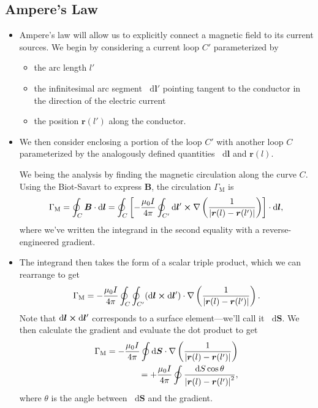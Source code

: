 \documentclass[11pt, a4paper]{article}
\newcommand{\diff}{\mathop{}\!\mathrm{d}} %
\renewcommand{\vec}[1]{\bm{#1}} %
\renewcommand{\r}{\vec{r}}
\newcommand{\B}{\vec{B}} %
\newcommand{\mm}{\mu_{0}}  %
\renewcommand{\j}{\vec{j}}  %
\renewcommand{\curl}{\nabla \cross}
\renewcommand{\grad}{\nabla}
\begin{document}
\subsection{Ampere's Law}
\begin{itemize}
	\item Ampere's law will allow us to explicitly connect a magnetic field to its current sources. We begin by considering a current loop $ C' $ parameterized by
    \begin{itemize}
        \item the arc length $ l' $

        \item the infinitesimal arc segment $ \diff \vec{l}' $ pointing tangent to the conductor in the direction of the electric current

        \item the position $ \r(l')  $ along the conductor.
    \end{itemize}

	\item We then consider enclosing a portion of the loop $ C' $ with another  loop $ C $ parameterized by the analogously defined quantities $ \diff \vec{l} $ and $ \r(l) $.
	
	
	We being the analysis by finding the magnetic circulation along the curve $ C $. Using the Biot-Savart to express $ \B $, the circulation $ \Gamma_{\text{M}} $ is
	\begin{equation*}
		\Gamma_{\text{M}} = \oint_{C} \B \cdot \diff \vec{l} = \oint_{C}\left[ - \frac{\mm I}{4 \pi} \oint_{C'}\diff \vec{l}' \cross \grad \left(\frac{1}{\abs{\r(l) - \r(l')}}\right) \right] \cdot \diff \vec{l},
	\end{equation*}
	where we've written the integrand in the second equality with a reverse-engineered gradient. 

    \item The integrand then takes the form of a scalar triple product, which we can rearrange to get
	\begin{equation*}
		\Gamma_{\text{M}} =  - \frac{\mm I}{4\pi} \oint_{C} \oint_{C'} (\diff \vec{l} \cross \diff \vec{l}') \cdot \grad \left(\frac{1}{\abs{\r(l) - \r(l')}}\right).
	\end{equation*}
	Note that $ \diff \vec{l} \cross \diff \vec{l}' $ corresponds to a surface element---we'll call it $ \diff \vec{S} $. We then calculate the gradient and evaluate the dot product to get
	\begin{align*}
		\Gamma_{\text{M}} =  - \frac{\mm I}{4\pi} \oint \diff \vec{S}\cdot \grad \left(\frac{1}{\abs{\r(l) - \r(l')}}\right) \\
		= +  \frac{\mm I}{4\pi} \oint  \frac{\diff S \cos \theta}{\abs{\r(l) - \r(l')}^{2}},
	\end{align*}
	where $ \theta $ is the angle between $ \diff \vec{S} $ and the gradient. 


\end{itemize}
\end{document}
